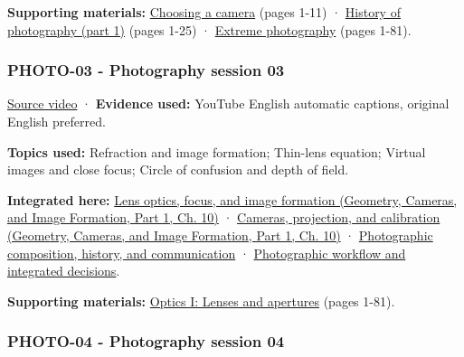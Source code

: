 \textbf{Supporting materials:} \href{https://drive.google.com/open?id=0B6w2XfPHEcZYQlF2U1VjRHRNLUE}{Choosing a camera} (pages 1-11) · \href{https://drive.google.com/open?id=0B6w2XfPHEcZYcm1nc0lRV0h4dzg}{History of photography (part 1)} (pages 1-25) · \href{https://drive.google.com/file/d/0B6w2XfPHEcZYVTZ5YzFzdXc3b0U/view?usp=sharing}{Extreme photography} (pages 1-81).

\subsubsection{PHOTO-03 - Photography session 03}\label{04-visual-computing-ii-ch036-photo-03---photography-session-03}

\hypertarget{04-visual-computing-ii-ch036-photo-03---photography-session-03}{}

\href{https://www.youtube.com/watch?v=Q-hIFIHay9I}{Source video} · \textbf{Evidence used:} YouTube English automatic captions, original English preferred.

\textbf{Topics used:} Refraction and image formation; Thin-lens equation; Virtual images and close focus; Circle of confusion and depth of field.

\textbf{Integrated here:} \href{../03-Geometry-Cameras-and-Image-Formation-P01/main.pdf\#03-visual-computing-i-ch003-lens-optics-focus-and-image-formation}{Lens optics, focus, and image formation (Geometry, Cameras, and Image Formation, Part 1, Ch. 10)} · \href{../03-Geometry-Cameras-and-Image-Formation-P01/main.pdf\#03-visual-computing-i-ch003-cameras-projection-and-calibration}{Cameras, projection, and calibration (Geometry, Cameras, and Image Formation, Part 1, Ch. 10)} · \hyperref[04-visual-computing-ii-ch034-photographic-composition-history-and-communication]{Photographic composition, history, and communication} · \hyperref[04-visual-computing-ii-ch034-photographic-workflow-and-integrated-decisions]{Photographic workflow and integrated decisions}.

\textbf{Supporting materials:} \href{https://drive.google.com/file/d/0B6w2XfPHEcZYT0dwaFF4emd6Vzg/view?usp=sharing}{Optics I: Lenses and apertures} (pages 1-81).

\subsubsection{PHOTO-04 - Photography session 04}\label{04-visual-computing-ii-ch036-photo-04---photography-session-04}

\hypertarget{04-visual-computing-ii-ch036-photo-04---photography-session-04}{}

